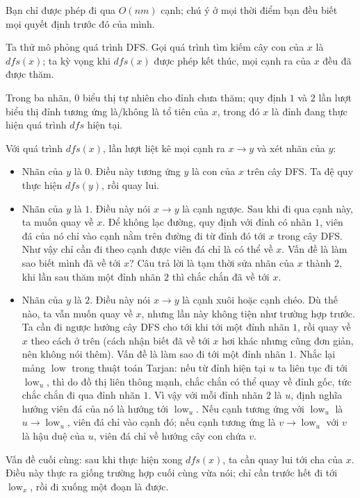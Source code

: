 \documentclass[11pt]{article}
\begin{document}
Bạn chỉ được phép đi qua $O(nm)$ cạnh; chú ý ở mọi thời điểm bạn đều biết mọi
quyết định trước đó của mình.

Ta thử mô phỏng quá trình DFS. Gọi quá trình tìm kiếm cây con của $x$ là
$dfs(x)$; ta kỳ vọng khi $dfs(x)$ được phép kết thúc, mọi cạnh ra của $x$ đều đã
được thăm.

Trong ba nhãn, $0$ biểu thị tự nhiên cho đỉnh chưa thăm; quy định $1$ và $2$ lần
lượt biểu thị đỉnh tương ứng là/không là tổ tiên của $x$, trong đó $x$ là đỉnh
đang thực hiện quá trình $dfs$ hiện tại.

Với quá trình $dfs(x)$, lần lượt liệt kê mọi cạnh ra $x\to y$ và xét nhãn của
$y$:
\begin{itemize}
  \item Nhãn của $y$ là $0$. Điều này tương ứng $y$ là con của $x$ trên cây DFS.
  Ta đệ quy thực hiện $dfs(y)$, rồi quay lui.
  \item Nhãn của $y$ là $1$. Điều này nói $x\to y$ là cạnh ngược. Sau khi đi
  qua cạnh này, ta muốn quay về $x$. Để không lạc đường, quy định với đỉnh có
  nhãn $1$, viên đá của nó chỉ vào cạnh nằm trên đường đi từ đỉnh đó tới $x$
  trong cây DFS. Như vậy chỉ cần đi theo cạnh được viên đá chỉ là có thể về
  $x$. Vấn đề là làm sao biết mình đã về tới $x$? Câu trả lời là tạm thời sửa
  nhãn của $x$ thành $2$, khi lần sau thăm một đỉnh nhãn $2$ thì chắc chắn đã về
  tới $x$.
  \item Nhãn của $y$ là $2$. Điều này nói $x\to y$ là cạnh xuôi hoặc cạnh chéo.
  Dù thế nào, ta vẫn muốn quay về $x$, nhưng lần này không tiện như trường hợp
  trước. Ta cần đi ngược hướng cây DFS cho tới khi tới một đỉnh nhãn $1$, rồi
  quay về $x$ theo cách ở trên (cách nhận biết đã về tới $x$ hơi khác nhưng cũng
  đơn giản, nên không nói thêm). Vấn đề là làm sao đi tới một đỉnh nhãn $1$.
  Nhắc lại mảng \(\operatorname{low}\) trong thuật toán Tarjan: nếu từ đỉnh hiện
  tại $u$ ta liên tục đi tới $\operatorname{low}_u$, thì do đồ thị liên thông
  mạnh, chắc chắn có thể quay về đỉnh gốc, tức chắc chắn đi qua đỉnh nhãn $1$.
  Vì vậy với mỗi đỉnh nhãn $2$ là $u$, định nghĩa hướng viên đá của nó là hướng
  tới $\operatorname{low}_u$. Nếu cạnh tương ứng với $\operatorname{low}_u$ là
  $u\to\operatorname{low}_u$, viên đá chỉ vào cạnh đó; nếu cạnh tương ứng là
  $v\to\operatorname{low}_u$ với $v$ là hậu duệ của $u$, viên đá chỉ về hướng
  cây con chứa $v$.
\end{itemize}

Vấn đề cuối cùng: sau khi thực hiện xong $dfs(x)$, ta cần quay lui tới cha của
$x$. Điều này thực ra giống trường hợp cuối cùng vừa nói; chỉ cần trước hết đi
tới $\operatorname{low}_x$, rồi đi xuống một đoạn là được.
\end{document}
